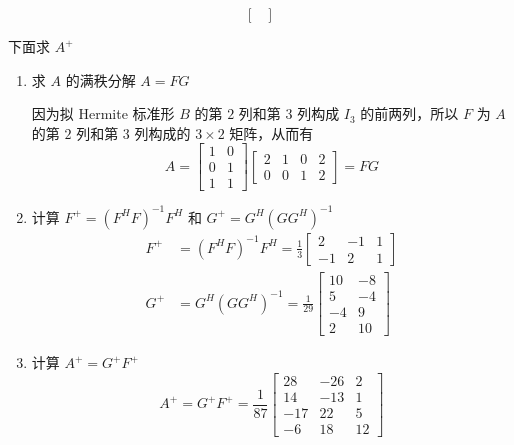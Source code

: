 \begin{solution}
\begin{enumerate}
\begin{equation*}
\begin{bmatrix}
                        \end{bmatrix}
                    \end{equation*}
                \end{enumerate}
                \par 下面求 $A^{+}$
                \begin{enumerate}
                    \item 求 $A$ 的满秩分解 $A = FG$
                        \par 因为拟 Hermite 标准形 $B$ 的第 $2$ 列和第 $3$ 列构成 $I_3$ 的前两列，所以 $F$ 为 $A$ 的第 $2$ 列和第 $3$ 列构成的 $3 \times 2$ 矩阵，从而有 
                        \begin{equation*}
                            A = \begin{bmatrix}
                                1 & 0 \\ 0 & 1 \\ 1 & 1
                            \end{bmatrix}\begin{bmatrix}
                                2 & 1 & 0 & 2 \\ 0 & 0 & 1 & 2
                            \end{bmatrix} = FG
                        \end{equation*}
                    \item 计算 $F^{+} = (F^HF)^{-1}F^H$ 和 $G^{+} = G^H(GG^H)^{-1}$
                        \begin{align*}
                            F^{+} &= (F^HF)^{-1}F^H = \frac{1}{3}\begin{bmatrix}
                                2 & -1 & 1 \\ -1 & 2 & 1
                            \end{bmatrix} \\ G^{+} &= G^H(GG^H)^{-1} = \frac{1}{29}\begin{bmatrix}
                                10 & -8 \\ 5 & -4 \\ -4 & 9 \\ 2 & 10
                            \end{bmatrix}
                        \end{align*} 
                    \item 计算 $A^{+} = G^{+}F^{+}$
                        \begin{equation*}
                            A^{+} = G^{+}F^{+} = \frac{1}{87}\begin{bmatrix}
                                28 & -26 & 2 \\ 14 & -13 & 1 \\ -17 & 22 & 5 \\ -6 & 18 & 12
                            \end{bmatrix}
                        \end{equation*}
                \end{enumerate}
            \end{solution}